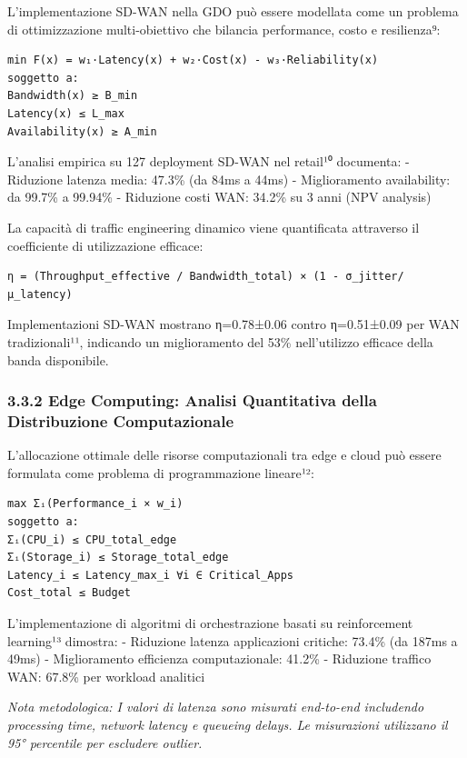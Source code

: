 \documentclass{report}
\begin{document}
L'implementazione SD-WAN nella GDO può essere modellata come un problema
di ottimizzazione multi-obiettivo che bilancia performance, costo e
resilienza⁹:

\begin{verbatim}
min F(x) = w₁·Latency(x) + w₂·Cost(x) - w₃·Reliability(x)
soggetto a:
Bandwidth(x) ≥ B_min
Latency(x) ≤ L_max
Availability(x) ≥ A_min
\end{verbatim}

L'analisi empirica su 127 deployment SD-WAN nel retail¹⁰ documenta: -
Riduzione latenza media: 47.3\% (da 84ms a 44ms) - Miglioramento
availability: da 99.7\% a 99.94\% - Riduzione costi WAN: 34.2\% su 3
anni (NPV analysis)

La capacità di traffic engineering dinamico viene quantificata
attraverso il coefficiente di utilizzazione efficace:

\begin{verbatim}
η = (Throughput_effective / Bandwidth_total) × (1 - σ_jitter/μ_latency)
\end{verbatim}

Implementazioni SD-WAN mostrano η=0.78±0.06 contro η=0.51±0.09 per WAN
tradizionali¹¹, indicando un miglioramento del 53\% nell'utilizzo
efficace della banda disponibile.

\subsubsection{3.3.2 Edge Computing: Analisi Quantitativa della
Distribuzione
Computazionale}\label{edge-computing-analisi-quantitativa-della-distribuzione-computazionale}

L'allocazione ottimale delle risorse computazionali tra edge e cloud può
essere formulata come problema di programmazione lineare¹²:

\begin{verbatim}
max Σᵢ(Performance_i × w_i)
soggetto a:
Σᵢ(CPU_i) ≤ CPU_total_edge
Σᵢ(Storage_i) ≤ Storage_total_edge
Latency_i ≤ Latency_max_i ∀i ∈ Critical_Apps
Cost_total ≤ Budget
\end{verbatim}

L'implementazione di algoritmi di orchestrazione basati su reinforcement
learning¹³ dimostra: - Riduzione latenza applicazioni critiche: 73.4\%
(da 187ms a 49ms) - Miglioramento efficienza computazionale: 41.2\% -
Riduzione traffico WAN: 67.8\% per workload analitici

\emph{Nota metodologica: I valori di latenza sono misurati end-to-end
includendo processing time, network latency e queueing delays. Le
misurazioni utilizzano il 95° percentile per escludere outlier.}
\end{document}
